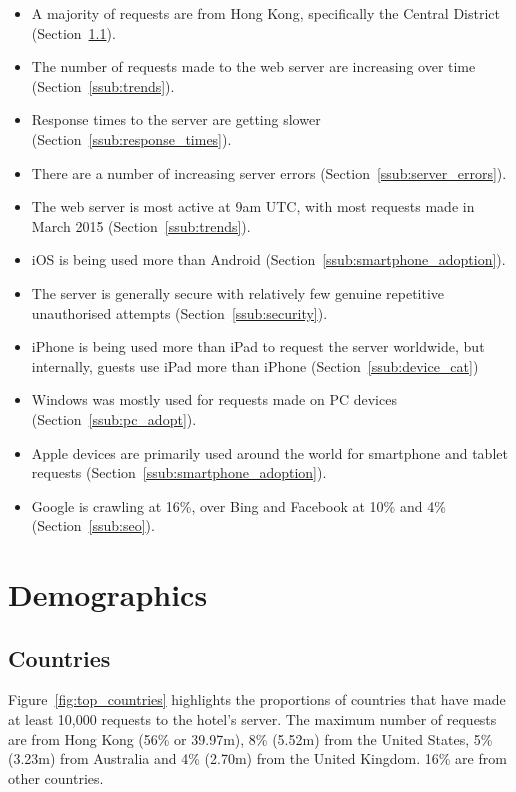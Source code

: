\documentclass[12pt,titlepage]{article}
\begin{document}
\begin{itemize}
  \item A majority of requests are from Hong Kong, specifically the Central District (Section~\ref{ssub:countries}).
  \item The number of requests made to the web server are increasing over time (Section~\ref{ssub:trends}).
  \item Response times to the server are getting slower (Section~\ref{ssub:response_times}).
  \item There are a number of increasing server errors (Section~\ref{ssub:server_errors}).
  \item The web server is most active at 9am UTC, with most requests made in March 2015 (Section~\ref{ssub:trends}).
  \item iOS is being used more than Android (Section~\ref{ssub:smartphone_adoption}).
  \item The server is generally secure with relatively few genuine repetitive unauthorised attempts (Section~\ref{ssub:security}).
  \item iPhone is being used more than iPad to request the server worldwide, but internally, guests use iPad more than iPhone (Section~\ref{ssub:device_cat})
  \item Windows was mostly used for requests made on PC devices (Section~\ref{ssub:pc_adopt}).
  \item Apple devices are primarily used around the world for smartphone and tablet requests (Section~\ref{ssub:smartphone_adoption}).
  \item Google is crawling at 16\%, over Bing and Facebook at 10\% and 4\% (Section~\ref{ssub:seo}).
\end{itemize}

\newpage
\section{Demographics}

\subsection{Countries}
\label{ssub:countries}

Figure~\ref{fig:top_countries} highlights the proportions of countries that have made at least 10,000 requests to the hotel's server. The maximum number of requests are from Hong Kong (56\% or 39.97m), 8\% (5.52m) from the United States, 5\% (3.23m) from Australia and 4\% (2.70m) from the United Kingdom. 16\% are from other countries.
\end{document}
